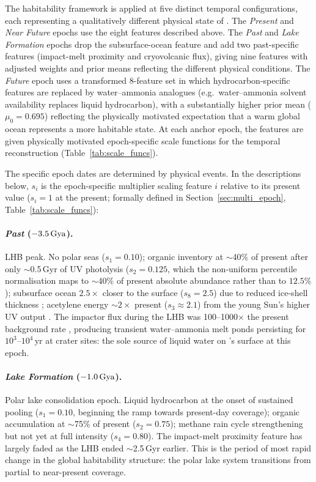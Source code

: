 The habitability framework is applied at five distinct temporal configurations, each representing a qualitatively different physical state of \titan{}.  The \textit{Present} and \textit{Near Future} epochs use the eight features described above.  The \textit{Past} and \textit{Lake Formation} epochs drop the subsurface-ocean feature and add two past-specific features (impact-melt proximity and cryovolcanic flux), giving nine features with adjusted weights and prior means reflecting the different physical conditions.  The \textit{Future} epoch uses a transformed 8-feature set in which hydrocarbon-specific features are replaced by water--ammonia analogues (e.g.\ water--ammonia solvent availability replaces liquid hydrocarbon), with a substantially higher prior mean ($\mu_0 = 0.695$) reflecting the physically motivated expectation that a warm global ocean represents a more habitable state.  At each anchor epoch, the features are given physically motivated epoch-specific scale functions for the temporal reconstruction (Table~\ref{tab:scale_funcs}).

The specific epoch dates are determined by physical events.  In the descriptions below, $s_i$ is the epoch-specific multiplier scaling feature $i$ relative to its present value ($s_i = 1$ at the present; formally defined in Section~\ref{sec:multi_epoch}, Table~\ref{tab:scale_funcs}):

\paragraph{\textit{Past} ($-3.5\,\text{Gya}$).}
LHB peak.  No polar seas ($s_1{=}0.10$); organic inventory at $\sim$40\% of present after only $\sim$0.5\,Gyr of UV photolysis ($s_2{=}0.125$, which the non-uniform percentile normalisation maps to $\sim$40\% of present absolute abundance rather than to $12.5\%$); subsurface ocean $2.5\times$ closer to the surface ($s_8{=}2.5$) due to reduced ice-shell thickness \citep{Tobie2005}; acetylene energy $\sim$$2\times$ present ($s_3{\approx}2.1$) from the young Sun's higher UV output \citep{Bahcall2001}.  The impactor flux during the LHB was 100--1000$\times$ the present background rate \citep{OBrien2005}, producing transient water--ammonia melt ponds persisting for $10^3$--$10^4$\,yr at crater sites: the sole source of liquid water on \titan{}'s surface at this epoch.

\paragraph{\textit{Lake Formation} ($-1.0\,\text{Gya}$).}
Polar lake consolidation epoch.  Liquid hydrocarbon at the onset of sustained pooling ($s_1{=}0.10$, beginning the ramp towards present-day coverage); organic accumulation at $\sim$75\% of present ($s_2{=}0.75$); methane rain cycle strengthening but not yet at full intensity ($s_4{=}0.80$).  The impact-melt proximity feature has largely faded as the LHB ended $\sim$2.5\,Gyr earlier.  This is the period of most rapid change in the global habitability structure: the polar lake system transitions from partial to near-present coverage.


